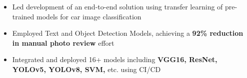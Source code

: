 \documentclass[a4paper,10pt]{article}
\newcommand{\isep}{-2 pt}
\begin{document}
\begin{itemize}
{{\begin{itemize}
        \item Led development of an end-to-end solution using transfer learning of pre-trained models for car image classification
        
        \item Employed Text and Object Detection Models, achieving a \textbf{92\% reduction in manual photo review} effort
        
        \item Integrated and deployed 16+ models including \textbf{VGG16, ResNet, YOLOv5, YOLOv8, SVM,} etc. using CI/CD
        
        
       
    \end{itemize}

}}
\end{itemize}
\end{document}
